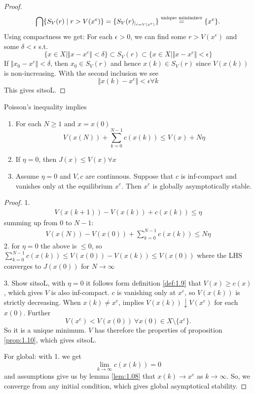 \begin{proof}
    \[\bigcap \{S_V(r)\mid r>V(x^e)\}=\{S_V(r)_{|_{r=V(x^e)}}\}\stackrel{\text{unique minimizer}}{=}\{x^e\}.\]
    Using compactness we get: For each \(\epsilon>0\), we can find some \(r>V(x^e)\)
    and some \(\delta<\epsilon\) s.t. 
    \[\{x\in X\mid \Vert x-x^e\Vert < \delta\}\subset S_V(r)\subset \{x\in X\mid \Vert x-x^e\Vert < \epsilon\}\]
    If \(\Vert x_0-x^e\Vert<\delta\), then \(x_0\in S_V(r)\) and hence \(x(k)\in S_V(r)\)
    since \(V(x(k))\) is non-increasing. With the second inclusion we see 
    \[\Vert x(k)-x^e\Vert<\epsilon\forall k\]
    This gives sitsoL.
\end{proof}

\begin{proposition}\label{prop:1.11}
    Poisson's inequality implies 
    \begin{enumerate}
        \item For each \(N\geq 1\) and \(x=x(0)\) \[V(x(N))+\sum_{k=0}^{N-1}c(x(k))\leq V(x)+ N\eta\]
        \item If \(\eta=0\), then \(J(x)\leq V(x)\forall x\)
        \item Assume \(\eta=0\) and \(V,c\) are continuous. Suppose that \(c\) is inf-compact and vanishes only at the equilibrium \(x^e\). Then 
              \(x^e\) is globally asymptotically stable.  
    \end{enumerate}
\end{proposition}

\begin{proof}
    1. \begin{align*}
        V(x(k+1))-V(x(k))+c(x(k))\leq \eta 
    \end{align*}
    summing up from \(0\) to \(N-1\):
    \begin{align*}
        V(x(N))-V(x(0))+\sum_{k=0}^{N-1}c(x(k))\leq N\eta
    \end{align*}
    2. for \(\eta=0\) the above is \(\leq 0\), so \(\sum_{k=0}^{N-1}c(x(k))\leq V(x(0))-V(x(k))\leq V(x(0))\)
    where the LHS converges to \(J(x(0))\) for \(N\to\infty\) 

    3. Show sitsoL,  with \(\eta=0\) it follows form definition \ref{def:1.9} that \(V(x)\geq c(x)\), which gives \(V\) is 
    also inf-compact. 
    \(c\) is vanishing only at \(x^e\), so \(V(x(k))\) is strictly decreasing. When \(x(k)\neq x^e\),
    implies \(V(x(k))\downarrow V(x^e)\) for each \(x(0)\). Further
    \[V(x^e)<V(x(0))\ \forall x(0)\in X\setminus\{x^e\}.\] 
    So it is a unique minimum. \(V\) has therefore the properties of proposition \ref{prop:1.10}, which gives sitsoL. 

    For global: with 1. we get \[\lim_{k\to\infty}c(x(k))=0\]
    and assumptions give us by lemma \ref{lem:1.08} that \(x(k)\to x^e\) as \(k\to\infty\).
    So, we converge from any initial condition, which gives global asymptotical stability.

\end{proof}


